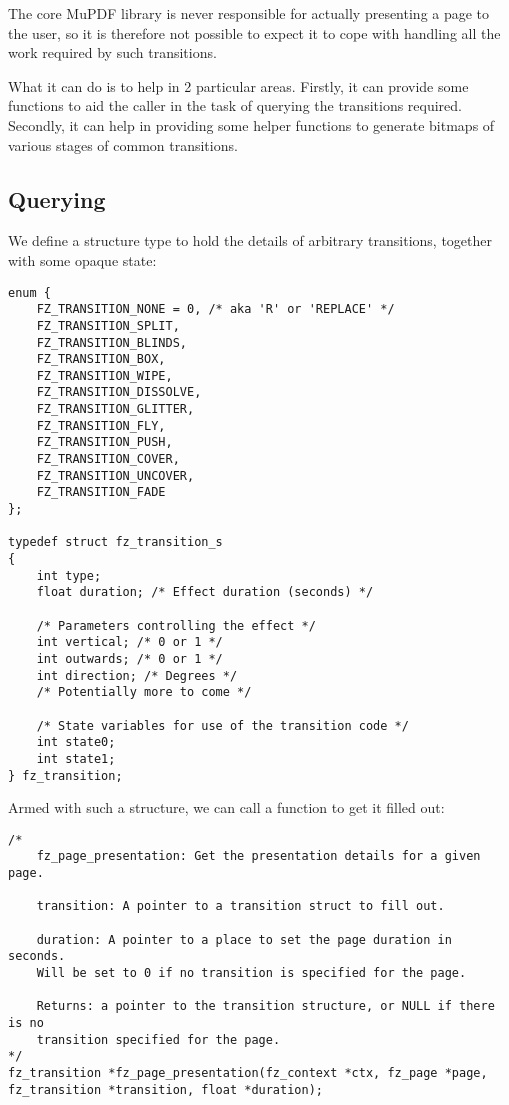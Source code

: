 \documentclass[oneside]{book}
\begin{document}
The core MuPDF library is never responsible for actually presenting a page to the user, so it is therefore not possible to expect it to cope with handling all the work required by such transitions.

What it can do is to help in 2 particular areas. Firstly, it can provide some functions to aid the caller in the task of querying the transitions required. Secondly, it can help in providing some helper functions to generate bitmaps of various stages of common transitions.

\subsection{Querying}

We define a structure type to hold the details of arbitrary transitions, together with some opaque state:

\begin{lstlisting}
enum {
	FZ_TRANSITION_NONE = 0, /* aka 'R' or 'REPLACE' */
	FZ_TRANSITION_SPLIT,
	FZ_TRANSITION_BLINDS,
	FZ_TRANSITION_BOX,
	FZ_TRANSITION_WIPE,
	FZ_TRANSITION_DISSOLVE,
	FZ_TRANSITION_GLITTER,
	FZ_TRANSITION_FLY,
	FZ_TRANSITION_PUSH,
	FZ_TRANSITION_COVER,
	FZ_TRANSITION_UNCOVER,
	FZ_TRANSITION_FADE
};

typedef struct fz_transition_s
{
	int type;
	float duration; /* Effect duration (seconds) */

	/* Parameters controlling the effect */
	int vertical; /* 0 or 1 */
	int outwards; /* 0 or 1 */
	int direction; /* Degrees */
	/* Potentially more to come */

	/* State variables for use of the transition code */
	int state0;
	int state1;
} fz_transition;
\end{lstlisting}

Armed with such a structure, we can call a function to get it filled out:

\begin{lstlisting}
/*
	fz_page_presentation: Get the presentation details for a given page.

	transition: A pointer to a transition struct to fill out.

	duration: A pointer to a place to set the page duration in seconds.
	Will be set to 0 if no transition is specified for the page.

	Returns: a pointer to the transition structure, or NULL if there is no
	transition specified for the page.
*/
fz_transition *fz_page_presentation(fz_context *ctx, fz_page *page, fz_transition *transition, float *duration);
\end{lstlisting}
\end{document}
